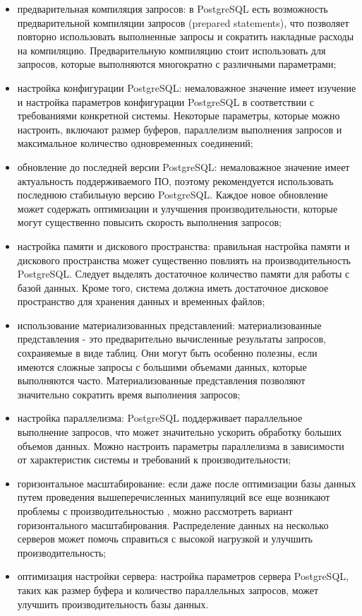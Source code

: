 \begin{itemize}
    \item предварительная компиляция запросов: в PostgreSQL есть возможность предварительной компиляции запросов (prepared statements), что позволяет повторно использовать выполненные запросы и сократить накладные расходы на компиляцию. Предварительную компиляцию стоит использовать для запросов, которые выполняются многократно с различными параметрами;
    \item настройка конфигурации PostgreSQL: немаловажное значение имеет изучение и настройка параметров конфигурации PostgreSQL в соответствии с требованиями конкретной системы. Некоторые параметры, которые можно настроить, включают размер буферов, параллелизм выполнения запросов и максимальное количество одновременных соединений;
    \item обновление до последней версии PostgreSQL: немаловажное значение имеет актуальность поддерживаемого ПО, поэтому рекомендуется использовать последнюю стабильную версию PostgreSQL. Каждое новое обновление может содержать оптимизации и улучшения производительности, которые могут существенно повысить скорость выполнения запросов;
    \item настройка памяти и дискового пространства: правильная настройка памяти и дискового пространства может существенно повлиять на производительность PostgreSQL. Следует выделять достаточное количество памяти для работы с базой данных. Кроме того, система должна иметь достаточное дисковое пространство для хранения данных и временных файлов;
    \item использование материализованных представлений: материализованные представления - это предварительно вычисленные результаты запросов, сохраняемые в виде таблиц. Они могут быть особенно полезны, если имеются сложные запросы с большими объемами данных, которые выполняются часто. Материализованные представления позволяют значительно сократить время выполнения запросов;
    \item настройка параллелизма: PostgreSQL поддерживает параллельное выполнение запросов, что может значительно ускорить обработку больших объемов данных. Можно настроить параметры параллелизма в зависимости от характеристик системы и требований к производительности;
    \item горизонтальное масштабирование: если даже после оптимизации базы данных путем проведения вышеперечисленных манипуляций все еще возникают проблемы с производительностью , можно рассмотреть вариант горизонтального масштабирования. Распределение данных на несколько серверов может помочь справиться с высокой нагрузкой и улучшить производительность;
    \item оптимизация настройки сервера: настройка параметров сервера PostgreSQL, таких как размер буфера и количество параллельных запросов, может улучшить производительность базы данных.
\end{itemize}

